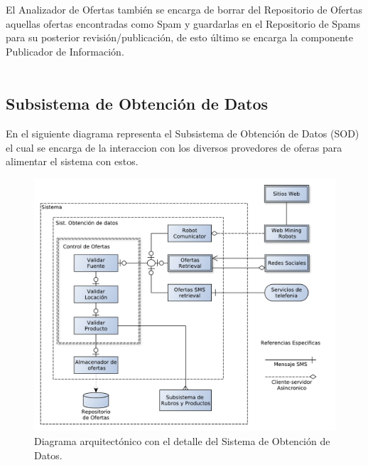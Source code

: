El \textsf{Analizador de Ofertas} también se encarga de borrar del \textsf{Repositorio de Ofertas} aquellas ofertas encontradas como Spam y guardarlas en el \textsf{Repositorio de Spams} para su posterior revisión/publicación, de esto último se encarga la componente \textsf{Publicador de Información}.\\


\\


\subsection{Subsistema de Obtención de Datos}


En el siguiente diagrama representa el Subsistema de Obtención de Datos (\textsf{SOD}) el cual se encarga de la interaccion con los diversos provedores de oferas para alimentar el sistema con estos.\\

\begin{figure}[H]
	\centering
	\includegraphics[width=\textwidth]{graficos/arch/Sistema_obtenedor_datos.pdf}
	\caption{Diagrama arquitectónico con el detalle del \textsf{Sistema de Obtención de Datos}.}
\end{figure}

